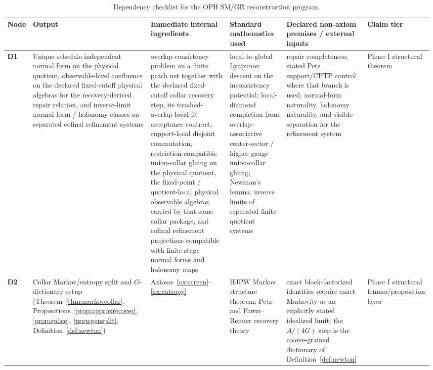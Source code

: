 \documentclass[11pt]{article}
\begin{document}
\begingroup
\tiny
\setlength{\tabcolsep}{1pt}
\begin{longtable}{@{}>{\raggedright\arraybackslash}p{}>{\raggedright\arraybackslash}p{}>{\raggedright\arraybackslash}p{}>{\raggedright\arraybackslash}p{}>{\raggedright\arraybackslash}p{}>{\raggedright\arraybackslash}p{}@{}}
\caption{Dependency checklist for the OPH SM/GR reconstruction program.}\\
\toprule
Node & Output & Immediate internal ingredients & Standard mathematics used & Declared non-axiom premises / external inputs & Claim tier \\
\midrule
\endhead
\bottomrule
\endfoot
\textbf{D1} & Unique schedule-independent normal form on the physical quotient, observable-level confluence on the declared fixed-cutoff physical algebras for the recovery-derived repair relation, and inverse-limit normal-form / holonomy classes on separated cofinal refinement systems & overlap-consistency problem on a finite patch net together with the declared fixed-cutoff collar recovery step, its touched-overlap local-fit acceptance contract, support-local disjoint commutation, restriction-compatible union-collar gluing on the physical quotient, the fixed-point / quotient-local physical observable algebras carried by that same collar package, and cofinal refinement projections compatible with finite-stage normal forms and holonomy maps & local-to-global Lyapunov descent on the inconsistency potential; local-diamond completion from overlap-associative center-sector / higher-gauge union-collar gluing; Newman's lemma; inverse limits of separated finite quotient systems & repair completeness; stated Petz support/CPTP control where that branch is used; normal-form naturality, holonomy naturality, and visible separation for the refinement system & Phase I structural theorem \\
\textbf{D2} & Collar Markov/entropy split and \(G\)-dictionary setup (Theorem~\ref{thm:markovcollar}, Propositions~\ref{prop:approxrecover}, \ref{prop:splice}, \ref{prop:gensplit}, Definition~\ref{def:newton}) & Axioms~\ref{ax:screen}--\ref{ax:entropy} & HJPW Markov structure theorem; Petz and Fawzi--Renner recovery theory & exact block-factorized identities require exact Markovity or an explicitly stated idealized limit; the \(A/(4G)\) step is the coarse-grained dictionary of Definition~\ref{def:newton} & Phase I structural lemma/proposition layer \\

\end{longtable}
\end{document}
